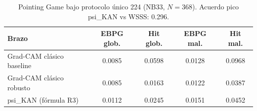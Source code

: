\begin{table}[htbp]
\centering
\small
\caption{Pointing Game bajo protocolo único 224 (NB33, $N=368$). Acuerdo pico psi\_KAN vs WSSS: 0.296.}
\label{tab:pointing_unified}
\begin{tabular}{lcccc}
\toprule
Brazo & EBPG glob. & Hit glob. & EBPG mal. & Hit mal. \\ \midrule
Grad-CAM clásico baseline & 0.0085 & 0.0598 & 0.0128 & 0.0968 \\
Grad-CAM clásico robusto & 0.0085 & 0.0163 & 0.0122 & 0.0387 \\
psi\_KAN (fórmula R3) & 0.0112 & 0.0245 & 0.0151 & 0.0452 \\
\bottomrule
\end{tabular}
\end{table}

